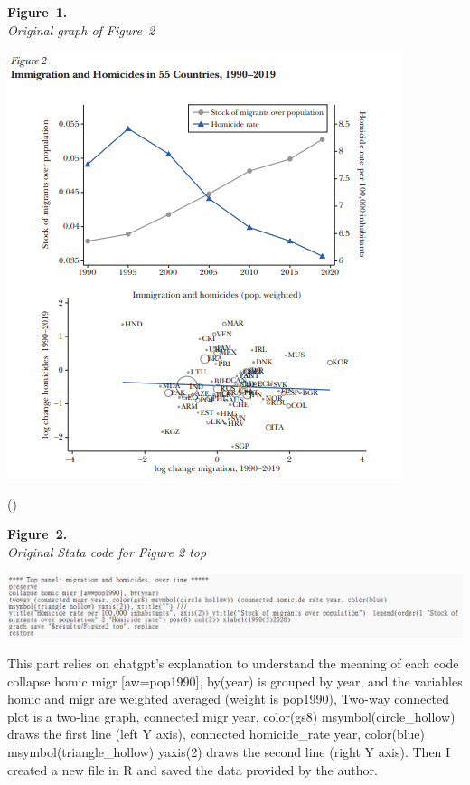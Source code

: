 \documentclass[
  man,
  floatsintext,
  longtable,
  nolmodern,
  notxfonts,
  notimes,
  colorlinks=true,linkcolor=blue,citecolor=blue,urlcolor=blue]{apa7}
\begin{document}
\label{fig:original}
\textbf{Figure~1.}\\
\emph{Original graph of Figure~2}

\begin{center}
\includegraphics[width=0.8\linewidth,height=\textheight,keepaspectratio]{fig/Original.png}
\end{center}

()

\textbf{Figure~2.}\\
\emph{Original Stata code for Figure 2 top}

\begin{center}
\includegraphics[width=0.8\linewidth,height=\textheight,keepaspectratio]{fig/statatop.png}
\end{center}

This part relies on chatgpt's explanation to understand the meaning of
each code collapse homic migr {[}aw=pop1990{]}, by(year) is grouped by
year, and the variables homic and migr are weighted averaged (weight is
pop1990), Two-way connected plot is a two-line graph, connected migr
year, color(gs8) msymbol(circle\_hollow) draws the first line (left Y
axis), connected homicide\_rate year, color(blue)
msymbol(triangle\_hollow) yaxis(2) draws the second line (right Y axis).
Then I created a new file in R and saved the data provided by the
author.
\end{document}
